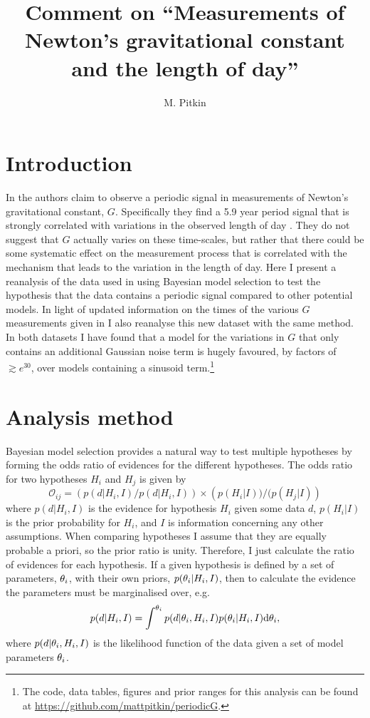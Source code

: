 \documentclass[doublecol]{epl2}
\title{Comment on ``Measurements of Newton's gravitational constant and the length of day''}
\author{M. Pitkin}
\institute{
  SUPA, School of Physics \& Astronomy, University of Glasgow, Glasgow, G12 8QQ, UK
}
\begin{document}
\maketitle

\section{Introduction}

In \cite{2015EL....11010002A} the authors claim to observe a periodic signal in measurements of
Newton's gravitational constant, $G$. Specifically they find a 5.9 year period signal that
is strongly correlated with variations in the observed length of day
\cite{2013Natur.499..202H}. They do not suggest that $G$ actually varies on these
time-scales, but rather that there could be some systematic effect on the measurement process that is
correlated with the mechanism that leads to the variation in the length of day.
Here I present a reanalysis of the data used in \cite{2015EL....11010002A}
using Bayesian model selection to test the hypothesis that the data contains
a periodic signal compared to other potential models. In light of updated information on the times
of the various $G$ measurements given in \cite{2015arXiv150501774S} I also reanalyse this new dataset with
the same method. In both datasets I have found that a model for the variations in $G$ that only contains an
additional Gaussian noise term is hugely favoured, by factors of $\gtrsim e^{30}$, over models containing
a sinusoid term.\footnote{The code, data tables, figures and prior ranges for this analysis can be
found at \url{https://github.com/mattpitkin/periodicG}.}

\section{Analysis method}

Bayesian model selection provides a natural way to test multiple hypotheses by forming the odds ratio of
evidences for the different hypotheses. The odds ratio for two hypotheses $H_i$ and $H_j$ is given by
\begin{equation}
 \mathcal{O}_{ij} = \left(p(d|H_i,I)/p(d|H_i,I)\right)\times\left(p(H_i|I))/(p(H_j|I)\right)
\end{equation}
where $p(d|H_i,I)$ is the evidence for hypothesis $H_i$ given some data $d$,
$p(H_i|I)$ is the prior probability for $H_i$, and $I$ is information concerning any other assumptions.
When comparing hypotheses I assume that they are equally
probable a priori, so the prior ratio is unity. Therefore, I just calculate
the ratio of evidences for each hypothesis. If a given hypothesis is defined
by a set of parameters, $\mathbf{\theta}_i$, with their own priors,
$p(\mathbf{\theta}_i|H_i,I)$, then to calculate the evidence the parameters must be marginalised
over, e.g.\
\begin{equation}\label{eq:evidence}
 p(d|H_i,I) = \int^{\mathbf{\theta}_i} p(d|\mathbf{\theta}_i,H_i,I) p(\mathbf{\theta}_i|H_i,I) {\rm d}\mathbf{\theta}_i,
\end{equation}
where $p(d|\mathbf{\theta}_i,H_i,I)$ is the likelihood function of the data given a set of model parameters $\mathbf{\theta}_i$.
\end{document}
